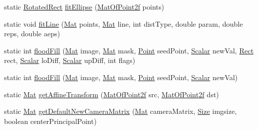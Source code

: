 \begin{DoxyCompactItemize}
static \mbox{\hyperlink{classorg_1_1opencv_1_1core_1_1_rotated_rect}{Rotated\+Rect}} \mbox{\hyperlink{classorg_1_1opencv_1_1imgproc_1_1_imgproc_aa1223b61730baf7b52760332c5cdd8f5}{fit\+Ellipse}} (\mbox{\hyperlink{classorg_1_1opencv_1_1core_1_1_mat_of_point2f}{Mat\+Of\+Point2f}} points)
\item 
static void \mbox{\hyperlink{classorg_1_1opencv_1_1imgproc_1_1_imgproc_a78923d7431756fb4cb2046359b75607f}{fit\+Line}} (\mbox{\hyperlink{classorg_1_1opencv_1_1core_1_1_mat}{Mat}} points, \mbox{\hyperlink{classorg_1_1opencv_1_1core_1_1_mat}{Mat}} line, int dist\+Type, double param, double reps, double aeps)
\item 
static int \mbox{\hyperlink{classorg_1_1opencv_1_1imgproc_1_1_imgproc_af2c9b324bfce19842e0a1dbc6e97caf7}{flood\+Fill}} (\mbox{\hyperlink{classorg_1_1opencv_1_1core_1_1_mat}{Mat}} image, \mbox{\hyperlink{classorg_1_1opencv_1_1core_1_1_mat}{Mat}} mask, \mbox{\hyperlink{classorg_1_1opencv_1_1core_1_1_point}{Point}} seed\+Point, \mbox{\hyperlink{classorg_1_1opencv_1_1core_1_1_scalar}{Scalar}} new\+Val, \mbox{\hyperlink{classorg_1_1opencv_1_1core_1_1_rect}{Rect}} rect, \mbox{\hyperlink{classorg_1_1opencv_1_1core_1_1_scalar}{Scalar}} lo\+Diff, \mbox{\hyperlink{classorg_1_1opencv_1_1core_1_1_scalar}{Scalar}} up\+Diff, int flags)
\item 
static int \mbox{\hyperlink{classorg_1_1opencv_1_1imgproc_1_1_imgproc_a86974fce952ae2763066b15290d01be9}{flood\+Fill}} (\mbox{\hyperlink{classorg_1_1opencv_1_1core_1_1_mat}{Mat}} image, \mbox{\hyperlink{classorg_1_1opencv_1_1core_1_1_mat}{Mat}} mask, \mbox{\hyperlink{classorg_1_1opencv_1_1core_1_1_point}{Point}} seed\+Point, \mbox{\hyperlink{classorg_1_1opencv_1_1core_1_1_scalar}{Scalar}} new\+Val)
\item 
static \mbox{\hyperlink{classorg_1_1opencv_1_1core_1_1_mat}{Mat}} \mbox{\hyperlink{classorg_1_1opencv_1_1imgproc_1_1_imgproc_a283e61c00d4e6ba9625264d8d7f5f8db}{get\+Affine\+Transform}} (\mbox{\hyperlink{classorg_1_1opencv_1_1core_1_1_mat_of_point2f}{Mat\+Of\+Point2f}} src, \mbox{\hyperlink{classorg_1_1opencv_1_1core_1_1_mat_of_point2f}{Mat\+Of\+Point2f}} dst)
\item 
static \mbox{\hyperlink{classorg_1_1opencv_1_1core_1_1_mat}{Mat}} \mbox{\hyperlink{classorg_1_1opencv_1_1imgproc_1_1_imgproc_adaa73e104d926966ba7d5666c4458e51}{get\+Default\+New\+Camera\+Matrix}} (\mbox{\hyperlink{classorg_1_1opencv_1_1core_1_1_mat}{Mat}} camera\+Matrix, \mbox{\hyperlink{classorg_1_1opencv_1_1core_1_1_size}{Size}} imgsize, boolean center\+Principal\+Point)
\item 

\end{DoxyCompactItemize}
